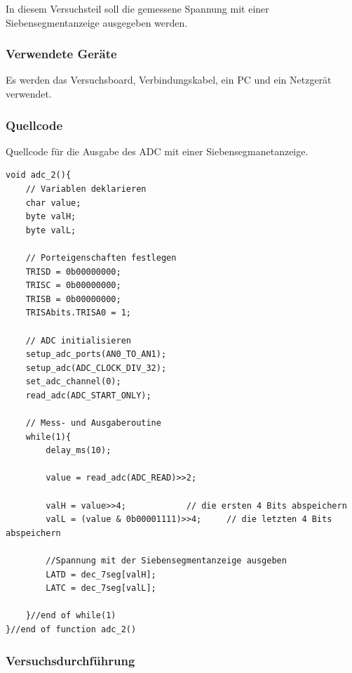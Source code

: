 \documentclass[12pt,a4paper]{article}
\begin{document}
In diesem Versuchsteil soll die gemessene Spannung mit einer Siebensegmentanzeige ausgegeben werden.

\subsubsection*{Verwendete Geräte}

Es werden das Versuchsboard, Verbindungskabel, ein PC und ein Netzgerät verwendet.

\subsubsection*{Quellcode}

Quellcode für die Ausgabe des ADC mit einer Siebensegmanetanzeige.

\lstset{language=C, basicstyle=\tiny}
\begin{lstlisting}[caption = {adc mit Siebensegmentanzeige}, label=lst:g_14,captionpos=b]
void adc_2(){
	// Variablen deklarieren
	char value;
	byte valH;
	byte valL;

	// Porteigenschaften festlegen
	TRISD = 0b00000000;
	TRISC = 0b00000000;
	TRISB = 0b00000000;
	TRISAbits.TRISA0 = 1;

	// ADC initialisieren
	setup_adc_ports(AN0_TO_AN1);
	setup_adc(ADC_CLOCK_DIV_32);
	set_adc_channel(0);
	read_adc(ADC_START_ONLY);
	
	// Mess- und Ausgaberoutine
	while(1){
		delay_ms(10);
		
		value = read_adc(ADC_READ)>>2;
		
		valH = value>>4;			// die ersten 4 Bits abspeichern
		valL = (value & 0b00001111)>>4;		// die letzten 4 Bits abspeichern
		
		//Spannung mit der Siebensegmentanzeige ausgeben
		LATD = dec_7seg[valH];
		LATC = dec_7seg[valL];
		
	}//end of while(1)
}//end of function adc_2()
\end{lstlisting}

\subsubsection*{Versuchsdurchführung}
\end{document}
